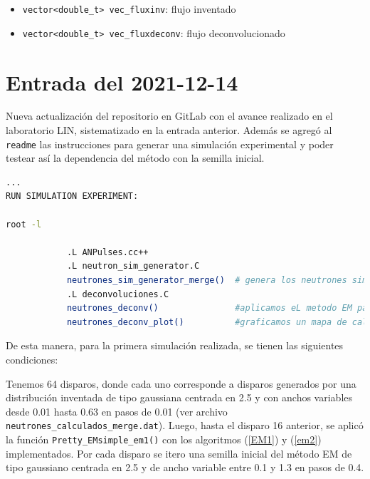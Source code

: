 \documentclass[11pt,letterpaper]{article}
\begin{document}
\begin{itemize}
\item[•] \verb|vector<double_t> vec_fluxinv|: flujo inventado\
\item[•] \verb|vector<double_t> vec_fluxdeconv|: flujo deconvolucionado

\end{itemize}




\section{Entrada del 2021-12-14}
\label{2021-12-14}

Nueva actualización del repositorio en GitLab con el avance realizado en el laboratorio LIN, sistematizado en la entrada anterior. Además se agregó al \verb|readme| las instrucciones para generar una simulación experimental y poder testear así la dependencia del método con la semilla inicial.


\begin{lstlisting}[language=bash]
...
RUN SIMULATION EXPERIMENT:

root -l

			.L ANPulses.cc++
			.L neutron_sim_generator.C
			neutrones_sim_generator_merge()  # genera los neutrones simulados
			.L deconvoluciones.C
			neutrones_deconv()               #aplicamos eL metodo EM para cada disparo
			neutrones_deconv_plot()          #graficamos un mapa de calor con la comparacion entre flujo deconvolucionado y flujo inventado, donde el eje z es Xi2 de EM2.
\end{lstlisting}

De esta manera, para la primera simulación realizada, se tienen las siguientes condiciones:

Tenemos 64 disparos, donde cada uno corresponde a disparos generados por una distribución inventada de tipo gaussiana centrada en 2.5 y con anchos variables desde 0.01 hasta 0.63 en pasos de 0.01 (ver archivo \verb|neutrones_calculados_merge.dat|). Luego, hasta el disparo 16 anterior, se aplicó la función \verb|Pretty_EMsimple_em1()| con los algoritmos (\ref{EM1}) y (\ref{em2}) implementados. Por cada disparo se itero una semilla inicial del método EM de tipo gaussiano centrada en 2.5 y de ancho variable entre 0.1 y 1.3 en pasos de 0.4.
\end{document}
